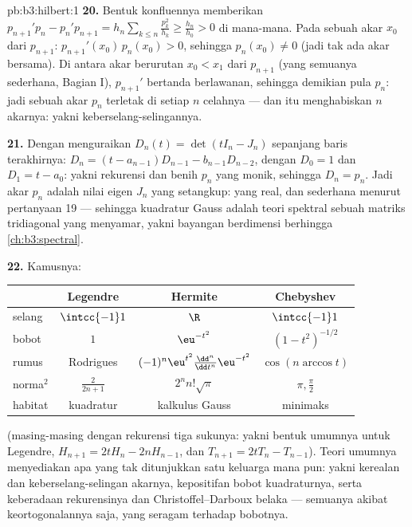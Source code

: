 \begin{solution}{pb:b3:hilbert:1}
\textbf{20.} Bentuk konfluennya memberikan $p_{n+1}'p_n -
p_n'p_{n+1} = h_n\sum_{k\leq n}\frac{p_k^2}{h_k} \geq
\frac{h_n}{h_0} > 0$ di mana-mana. Pada sebuah akar $x_0$ dari
$p_{n+1}$: $p_{n+1}'(x_0)\,p_n(x_0) > 0$, sehingga $p_n(x_0) \neq
0$ (jadi tak ada akar bersama). Di antara akar berurutan $x_0 < x_1$
dari $p_{n+1}$ (yang semuanya sederhana, Bagian I), $p_{n+1}'$ bertanda
berlawanan, sehingga demikian pula $p_n$: jadi sebuah akar $p_n$ terletak di setiap
$n$ celahnya --- dan itu menghabiskan $n$ akarnya: yakni
keberselang-selingannya.

\textbf{21.} Dengan menguraikan $D_n(t) = \det(tI_n - J_n)$ sepanjang
baris terakhirnya: $D_n = (t - a_{n-1})D_{n-1} - b_{n-1}D_{n-2}$,
dengan $D_0 = 1$ dan $D_1 = t - a_0$: yakni rekurensi dan benih
$p_n$ yang monik, sehingga $D_n = p_n$. Jadi akar $p_n$ adalah
nilai eigen $J_n$ yang setangkup: yang real, dan sederhana menurut
pertanyaan 19 --- sehingga kuadratur Gauss adalah teori spektral sebuah
matriks tridiagonal yang menyamar, yakni bayangan berdimensi berhingga
\cref{ch:b3:spectral}.

\textbf{22.} Kamusnya:
\begin{center}
\begin{tabular}{l|c|c|c}
 & Legendre & Hermite & Chebyshev\\
\hline
selang & $\intcc{-1}1$ & $\R$ & $\intcc{-1}1$\\
bobot & $1$ & $\eu^{-t^2}$ & $(1-t^2)^{-1/2}$\\
rumus & Rodrigues & $(-1)^n\eu^{t^2}
\frac{\dd^n}{\dd t^n}\eu^{-t^2}$ & $\cos(n\arccos t)$\\
norma$^2$ & $\frac2{2n+1}$ & $2^nn!\sqrt\pi$ & $\pi,
\frac\pi2$\\
habitat & kuadratur & kalkulus Gauss & minimaks\\
\end{tabular}
\end{center}
(masing-masing dengan rekurensi tiga sukunya: yakni bentuk umumnya untuk
Legendre, $H_{n+1} = 2tH_n - 2nH_{n-1}$, dan $T_{n+1} = 2tT_n -
T_{n-1}$). Teori umumnya menyediakan apa yang tak ditunjukkan satu keluarga
mana pun: yakni kerealan dan keberselang-selingan akarnya, kepositifan
bobot kuadraturnya, serta keberadaan rekurensinya dan
Christoffel--Darboux belaka --- semuanya akibat keortogonalannya
saja, yang seragam terhadap bobotnya.


\end{solution}
